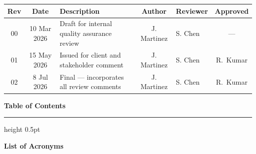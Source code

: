 \documentclass[11pt,a4paper]{article}
\begin{document}
\vspace{8pt}
\renewcommand{\arraystretch}{1.3}
\begin{tabularx}{\linewidth}{@{}c c >{\raggedright\arraybackslash}X c >{\raggedright\arraybackslash}X c @{}}
\toprule
\rowcolor{accent}
\color{white}\bfseries Rev & \color{white}\bfseries Date & \color{white}\bfseries Description & \color{white}\bfseries Author & \color{white}\bfseries Reviewer & \color{white}\bfseries Approved \\
\midrule
00 & 10 Mar 2026 & Draft for internal quality assurance review & J. Martinez & S. Chen & --- \\
01 & 15 May 2026 & Issued for client and stakeholder comment & J. Martinez & S. Chen & R.\ Kumar \\
02 & 8 Jul 2026  & Final --- incorporates all review comments & J. Martinez & S. Chen & R.\ Kumar \\
\bottomrule
\end{tabularx}

\vspace{12pt}

{\color{accent}\large\bfseries Table of Contents}
\vspace{6pt}

\renewcommand{\contentsname}{}
{\small\tableofcontents}
\vspace{6pt}
{\color{accent!30}\hrule height 0.5pt}

\vspace{14pt}
{\color{accent}\large\bfseries List of Acronyms}
\vspace{8pt}
\end{document}
